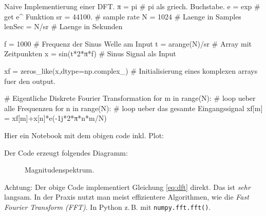 \begin{python}{Naive Implementierung einer DFT.}
π = pi # pi als griech. Buchstabe.
e = exp # get e^ Funktion
sr = 44100. # sample rate
N = 1024 # Laenge in Samples
lenSec = N/sr # Laenge in Sekunden

f = 1000 # Frequenz der Sinus Welle am Input
t = arange(N)/sr # Array mit Zeitpunkten
x = sin(t*2*π*f) # Sinus Signal als Input

xf = zeros_like(x,dtype=np.complex_) # Initialisierung eines komplexen arrays fuer den output.

# Eigentliche Diskrete Fourier Transformation
for m in range(N): # loop ueber alle Frequenzen
    for n in range(N): # loop ueber das gesamte Eingangssignal
        xf[m] = xf[m]+x[n]*e(-1j*2*π*n*m/N)
\end{python}

Hier ein Notebook mit dem obigen code inkl. Plot:


Der Code erzeugt folgendes Diagramm:

\begin{figure}[H]
    \centering
    
    \caption{Magnitudenspektrum.}
    \label{fig:specNaive}
\end{figure}

Achtung: Der obige Code implementiert Gleichung \ref{eq:dft} direkt. Das ist \textit{sehr} langsam. In der Praxis nutzt man meist effizientere Algorithmen, wie die \emph{Fast Fourier Transform (FFT)}. In Python z.\,B. mit \texttt{numpy.fft.fft()}. 


